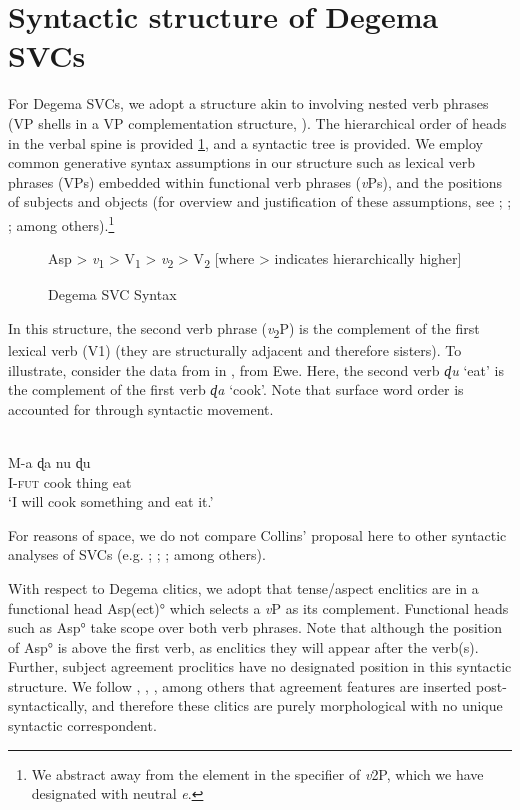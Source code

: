 \documentclass[output=paper]{langsci/langscibook}
\begin{document}
\section{Syntactic structure of Degema SVCs}
For Degema SVCs, we adopt a structure akin to \citet{Collins1997,Collins2002} involving nested verb phrases (VP shells in a VP complementation structure, \citealt{ClearyKemp2015}). The hierarchical order of heads in the verbal spine is provided \ref{figure:1}, and a syntactic tree is provided. We employ common generative syntax assumptions in our structure such as lexical verb phrases (VPs) embedded within functional verb phrases (\textit{v}Ps), and the positions of subjects and objects (for overview and justification of these assumptions, see \citealt{Chomsky1995}; \citealt{Adger2003}; \citealt{Radford2004}; among others).\footnote{We abstract away from the element in the specifier of \textit{v}2P, which we have designated with neutral \textit{e}.
}

\begin{figure}

Asp > \textit{v}\textsubscript{1} > V\textsubscript{1} > \textit{v}\textsubscript{2} > V\textsubscript{2}
[where > indicates hierarchically higher]
\label{figure:1}

\caption{Degema SVC Syntax}
\end{figure}

In this structure, the second verb phrase (\textit{v}\textsubscript{2}P) is the complement of the first lexical verb (V1) (they are structurally adjacent and therefore sisters). To illustrate, consider the data from \citet{Collins1997} in , from Ewe. Here, the second verb \textit{ɖu} ‘eat’ is the complement of the first verb\textit{ ɖa} ‘cook’. Note that surface word order is accounted for through syntactic movement.

\ea\label{ex:rolle:35}
\\
\gll  M-a  ɖa    nu    ɖu\\
     I-\textsc{fut}  cook  thing  eat\\
\glt ‘I will cook something and eat it.’ \citep[490-491]{Collins1997}
\z

For reasons of space, we do not compare Collins’ proposal here to other syntactic analyses of SVCs (e.g. \citealt{Baker1989};  \citealt{HiraiwaBodomo2008}; \citealt{Aboh2009}; among others). 

With respect to Degema clitics, we adopt that tense/aspect enclitics are in a functional head Asp(ect)° which selects a \textit{v}P as its complement. Functional heads such as Asp° take scope over both verb phrases. Note that although the position of Asp° is above the first verb, as enclitics they will appear after the verb(s). Further, subject agreement proclitics have no designated position in this syntactic structure. We follow \citet{EmbickNoyer2007}, \citet{Kramer2010}, \citet{Norris2014}, among others that agreement features are inserted post-syntactically, and therefore these clitics are purely morphological with no unique syntactic correspondent. 
\end{document}
